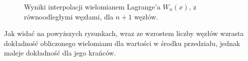 \documentclass{article}
\begin{document}
\begin{figure}[H]
\caption{Wyniki interpolacji wielomianem Lagrange'a $W_n(x)$, z równoodległymi węzłami, dla $n+1$ węzłów.}
\end{figure}

Jak widać na powyższych rysunkach, wraz ze wzrostem liczby węzłów wzrasta dokładność obliczonego wielomianu dla wartości w środku przedziału, jednak maleje dokładność dla jego krańców.
\end{document}
